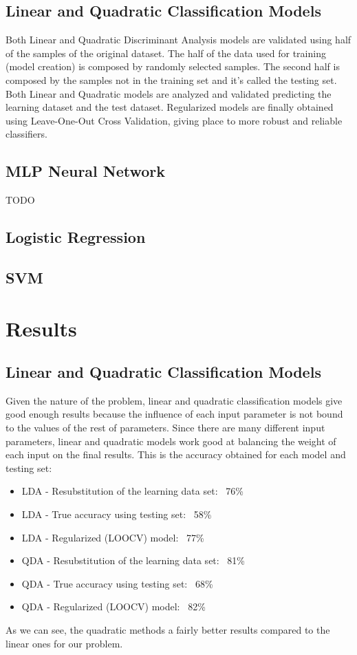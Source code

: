 \documentclass[english]{scrartcl}
\begin{document}
    \subsection{Linear and Quadratic Classification Models}\label{sec:methods:ldaqda}
    Both Linear and Quadratic Discriminant Analysis models are validated using
    half of the samples of the original dataset. The half of the data used for training (model creation) is composed by
    randomly selected samples. The second half is composed by the samples not in the training set and it's called the 
    testing set. Both Linear and Quadratic models are analyzed and validated predicting the learning dataset and the test
    dataset. Regularized models are finally obtained using Leave-One-Out Cross Validation, giving place to more robust
    and reliable classifiers.
    
    \subsection{MLP Neural Network}
    TODO
    
    \subsection{Logistic Regression}
    
    \subsection{SVM}

\section{Results}

    \subsection{Linear and Quadratic Classification Models}
    Given the nature of the problem, linear and quadratic classification models give good enough results because the influence
    of each input parameter is not bound to the values of the rest of parameters. Since there are many different input parameters,
    linear and quadratic models work good at balancing the weight of each input on the final results. This is the accuracy
    obtained for each model and testing set:
    \begin{itemize}
    \item LDA - Resubstitution of the learning data set: ~76\%
    \item LDA - True accuracy using testing set: ~58\%
    \item LDA - Regularized (LOOCV) model: ~77\%
    \item QDA - Resubstitution of the learning data set: ~81\%
    \item QDA - True accuracy using testing set: ~68\%
    \item QDA - Regularized (LOOCV) model: ~82\%
    \end{itemize}
    As we can see, the quadratic methods a fairly better results compared to the linear ones for our problem.
    
\end{document}
